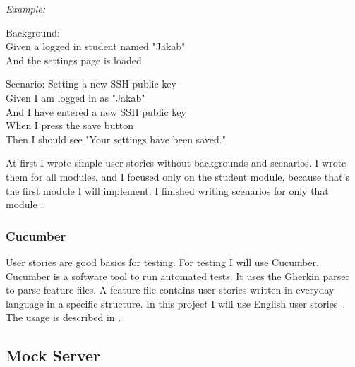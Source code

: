 \emph{Example:}

Background:\\ \hspace*{1cm}
Given a logged in student named "Jakab"\\ \hspace*{1cm}
And the settings page is loaded

Scenario: Setting a new SSH public key\\ \hspace*{1cm}
Given I am logged in as "Jakab"\\ \hspace*{1cm}
And I have entered a new SSH public key\\ \hspace*{1cm}
When I press the save button\\ \hspace*{1cm}
Then I should see "Your settings have been saved."

At first I wrote simple user stories without backgrounds and scenarios. I wrote them for all modules, and I focused only on the student module, because that's the first module I will implement. I finished writing scenarios for only that module .

\subsubsection{Cucumber}



User stories are good basics for testing. For testing I will use Cucumber. Cucumber is a software tool to run automated tests. It uses the Gherkin parser to parse feature files. A feature file contains user stories written in everyday language in a specific structure. In this project I will use English user stories~\cite{Cucumber-gherkin}. The usage is described in .


\subsection{Mock Server}



